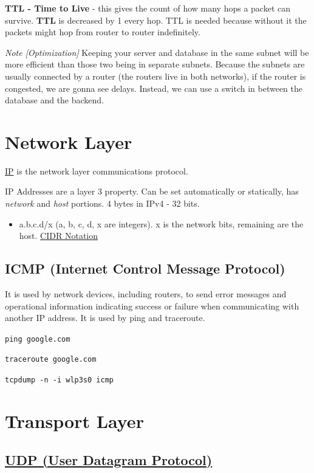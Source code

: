 \documentclass{article}
\begin{document}
\textbf{TTL - Time to Live} - this gives the count of how many hops a packet can survive. \textbf{TTL} is decreased by 1 every hop. TTL is needed because without it the packets might hop from router to router indefinitely.

\textit{Note [Optimization]} Keeping your server and database in the same subnet will be more efficient than those two being in separate subnets. Because the subnets are usually connected by a router (the routers live in both networks), if the router is congested, we are gonna see delays. Instead, we can use a switch in between the database and the backend.

\section*{Network Layer}

\href{https://en.wikipedia.org/wiki/Internet_Protocol}{IP} is the network layer communications protocol.

IP Addresses are a layer 3 property. Can be set automatically or statically, has \textit{network} and \textit{host} portions. 4 bytes in IPv4 - 32 bits.

\begin{itemize}
    \item a.b.c.d/x (a, b, c, d, x are integers). x is the network bits, remaining are the host. \href{https://en.wikipedia.org/wiki/Classless_Inter-Domain_Routing}{CIDR Notation}
\end{itemize}

\subsection*{ICMP (Internet Control Message Protocol)}
It is used by network devices, including routers, to send error messages and operational information indicating success or failure when communicating with another IP address. It is used by ping and traceroute.

\texttt{ping google.com}

\texttt{traceroute google.com}

\texttt{tcpdump -n -i wlp3s0 icmp}

\section*{Transport Layer}

\subsection*{\href{https://en.wikipedia.org/wiki/User_Datagram_Protocol}{UDP (User Datagram Protocol)}}
\end{document}
